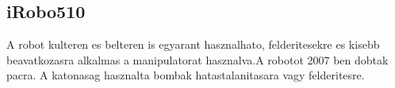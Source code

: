 \renewcommand{\xname}{iRobo510}
\renewcommand{\x}{0.521}
\renewcommand{\y}{0.686}
\renewcommand{\z}{0.178}
\renewcommand{\weight}{20}
\renewcommand{\img}{MobilisRobotok/iRobo/iRobo510.jpg}
\renewcommand{\sources}{Forrás: https://www.army-technology.com}
\renewcommand{\captionn}{iRobo 510 lanctalpas packboot}
\renewcommand{\watherProf}{Igen -3m ig.}
\renewcommand{\sebesseg}{9.3}
\renewcommand{\weight}{10.89}
\renewcommand{\AcAndGy}{Igen}
\renewcommand{\GPS}{Igen}
\subsection*{iRobo510}
 A robot kulteren es belteren is egyarant hasznalhato, felderitesekre es kisebb beavatkozasra alkalmas a manipulatorat hasznalva.A robotot 2007 ben dobtak pacra. A katonasag hasznalta bombak hatastalanitasara vagy felderitesre. 

\renewcommand{\aspectratioPic}{0.5}



